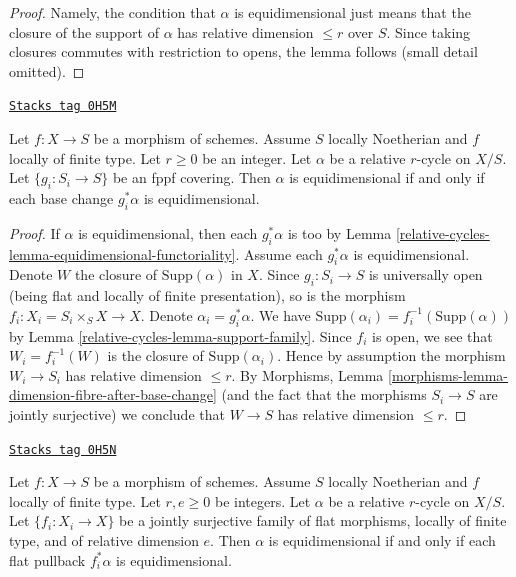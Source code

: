 \begin{proof}
Namely, the condition that $\alpha$ is equidimensional just means that
the closure of the support of $\alpha$ has relative dimension $\leq r$
over $S$. Since taking closures commutes with restriction to opens,
the lemma follows (small detail omitted).
\end{proof}

\begin{lemma}
\label{relative-cycles-lemma-equidimensional-fppf-descent}
\href{https://stacks.math.columbia.edu/tag/0H5M}{\texttt{Stacks tag 0H5M}}

Let $f : X \to S$ be a morphism of schemes. Assume $S$ locally Noetherian
and $f$ locally of finite type. Let $r \geq 0$ be an integer. Let $\alpha$
be a relative $r$-cycle on $X/S$. Let $\{g_i : S_i \to S\}$
be an fppf covering. Then $\alpha$ is equidimensional
if and only if each base change $g_i^*\alpha$ is equidimensional.
\end{lemma}

\begin{proof}
If $\alpha$ is equidimensional, then each $g_i^*\alpha$ is too by
Lemma \ref{relative-cycles-lemma-equidimensional-functoriality}. Assume each $g_i^*\alpha$
is equidimensional. Denote $W$ the closure
of $\text{Supp}(\alpha)$ in $X$. Since $g_i : S_i \to S$ is universally open
(being flat and locally of finite presentation), so is the morphism
$f_i : X_i = S_i \times_S X \to X$. Denote $\alpha_i = g_i^*\alpha$. We have
$\text{Supp}(\alpha_i) = f_i^{-1}(\text{Supp}(\alpha))$ by
Lemma \ref{relative-cycles-lemma-support-family}.
Since $f_i$ is open, we see that $W_i = f_i^{-1}(W)$ is the closure
of $\text{Supp}(\alpha_i)$. Hence by assumption the morphism
$W_i \to S_i$ has relative dimension $\leq r$.
By Morphisms, Lemma \ref{morphisms-lemma-dimension-fibre-after-base-change}
(and the fact that the morphisms $S_i \to S$ are jointly surjective)
we conclude that $W \to S$ has relative dimension $\leq r$.
\end{proof}

\begin{lemma}
\label{relative-cycles-lemma-equidimensional-descent-pullbacks}
\href{https://stacks.math.columbia.edu/tag/0H5N}{\texttt{Stacks tag 0H5N}}

Let $f : X \to S$ be a morphism of schemes. Assume $S$ locally Noetherian
and $f$ locally of finite type. Let $r, e \geq 0$ be integers.
Let $\alpha$ be a relative $r$-cycle on $X/S$.
Let $\{f_i : X_i \to X\}$ be a jointly surjective family
of flat morphisms, locally of finite type, and of relative dimension $e$.
Then $\alpha$ is equidimensional if and only if each flat
pullback $f_i^*\alpha$ is equidimensional.
\end{lemma}

